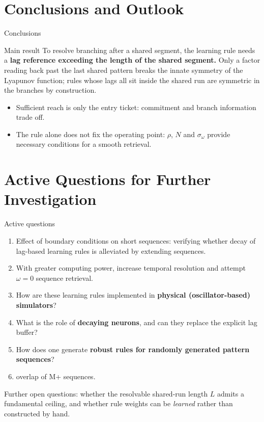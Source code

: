 \documentclass[aspectratio=169]{beamer}
\begin{document}
\section[Conclusions]{Conclusions and Outlook}



\begin{frame}{Conclusions}
  \begin{block}{Main result}
    To resolve branching after a shared segment, the learning rule needs a
    \textbf{lag reference exceeding the length of the shared segment.} Only a
    factor reading back past the last shared pattern breaks the innate
    symmetry of the Lyapunov function; rules whose lags all sit inside the
    shared run are symmetric in the branches by construction.
  \end{block}
  \begin{itemize}
    \item Sufficient reach is only the entry ticket: commitment and
      branch information trade off.
    \item The rule alone does not fix the operating point: $\rho$, $N$ and
      $\sigma_\omega$ provide necessary conditions for a smooth retrieval.
  \end{itemize}
\end{frame}


\section[Open Questions]{Active Questions for Further Investigation}

\begin{frame}{Active questions}
  \begin{enumerate}
    \item Effect of boundary conditions on short sequences: verifying whether decay of lag-based learning rules is alleviated by extending sequences.
    \item With greater computing power, increase temporal resolution and attempt $\omega=0$ sequence retrieval.
    \item How are these learning rules implemented in \textbf{physical
      (oscillator-based) simulators}?
    \item What is the role of \textbf{decaying neurons}, and can they
      replace the explicit lag buffer?
    \item How does one generate \textbf{robust rules for randomly generated
      pattern sequences}?
    \item overlap of M+ sequences.
  \end{enumerate}
  \vspace{3mm}
  {\small Further open questions: whether the resolvable shared-run length
  $L$ admits a fundamental ceiling, and whether rule weights can be
  \emph{learned} rather than constructed by hand.}
\end{frame}
\end{document}
